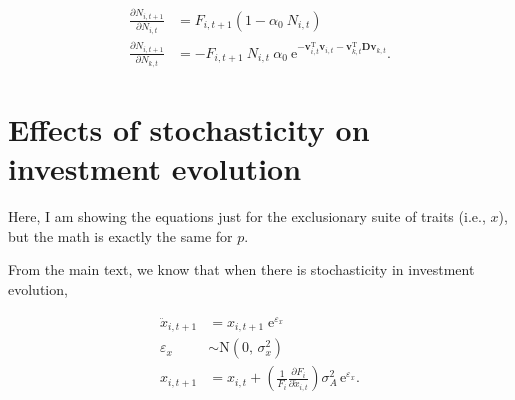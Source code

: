 \begin{equation*}
\begin{split}
    \frac{ \partial N_{i,t+1} }{ \partial N_{i,t} } &= 
        F_{i,t+1}
        \left(
            1 - \alpha_0 \: N_{i,t} 
        \right) \\
    \frac{ \partial N_{i,t+1} }{ \partial N_{k,t} } &= 
        - F_{i,t+1} \: N_{i,t} \: \alpha_0 \: 
        \text{e}^{ -\mathbf{v}_{i,t}^{\text{T}} \mathbf{v}_{i,t} -
            \mathbf{v}_{k,t}^{\text{T}} \mathbf{D} \mathbf{v}_{k,t} } 
    \textrm{.}
\end{split}
\end{equation*}













\section*{Effects of stochasticity on investment evolution}

Here, I am showing the equations just for the exclusionary suite of traits
(i.e., $x$), but the math is exactly the same for $p$.

From the main text, we know that when there is stochasticity in 
investment evolution, 

\begin{equation*}
\begin{split}
    \ddot{x}_{i,t+1} &= x_{i,t+1} \; \text{e}^{\varepsilon_x} \\
    \varepsilon_x &\sim \text{N}(0, \, \sigma^2_{x}) \\
    x_{i,t+1} &= x_{i,t} + \left( \frac{1}{F_i}
        \frac{\partial F_i}{\partial \ddot{x}_{i,t}} \right) \sigma_A^2 \, \text{e}^{\varepsilon_x}
    \text{.}
\end{split}
\end{equation*}



